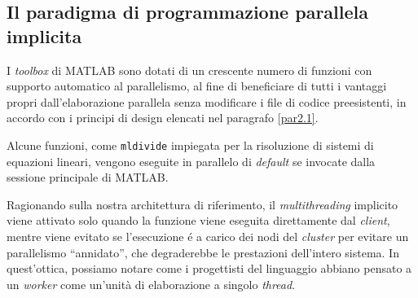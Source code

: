 \subsection{Il paradigma di programmazione parallela implicita}
I \textit{toolbox} di MATLAB sono dotati di un crescente numero di funzioni con supporto automatico al parallelismo, al fine di beneficiare di tutti 
i vantaggi propri dall'elaborazione parallela senza modificare i file di codice preesistenti, in accordo con i principi di design elencati nel paragrafo \ref{par2.1}. 

Alcune funzioni, come \lstinline|mldivide| impiegata per la risoluzione di sistemi di equazioni lineari, vengono eseguite in parallelo di \textit{default} se invocate dalla sessione principale di MATLAB. 

Ragionando sulla nostra architettura di riferimento, il \textit{multithreading} implicito viene attivato solo quando la funzione viene eseguita direttamente dal \textit{client}, mentre viene evitato se l'esecuzione \'e a carico dei nodi del \textit{cluster} per evitare un parallelismo \enquote{annidato}, che degraderebbe le prestazioni dell'intero sistema. \newline
In quest'ottica, possiamo notare come i progettisti del linguaggio abbiano pensato a un \textit{worker} come un'unit\`a di elaborazione a singolo \textit{thread}.

